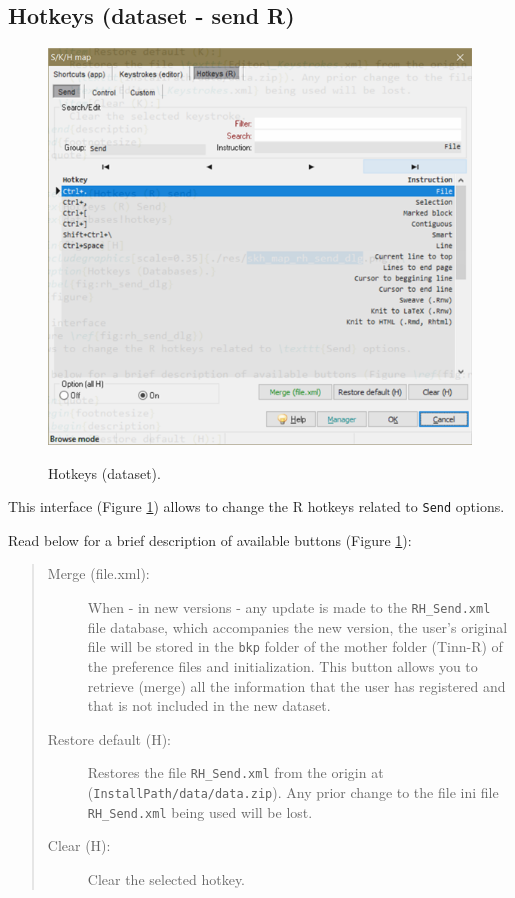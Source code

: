 \subsection{Hotkeys (dataset - send R)}

\begin{figure}[H]
  \includegraphics[scale=0.35]{./res/dlg_skh_map_rh_send.png}\\
  \caption{Hotkeys (dataset).}
  \label{fig:rh_send_dlg}
\end{figure}

This interface
(Figure \ref{fig:rh_send_dlg})
allows to change the R hotkeys related to \texttt{Send} options.

Read below for a brief description of available buttons (Figure \ref{fig:rh_send_dlg}):

\begin{quote}
  \begin{footnotesize}
    \begin{description}
      \item[Merge (file.xml):]
        When - in new versions - any update is made to the \texttt{RH\_Send.xml} file database,
        which accompanies the new version, the user's original file will be stored in
        the \texttt{bkp} folder of the mother folder (Tinn-R) of the preference files and initialization.
        This button allows you to retrieve (merge) all the information that the user has registered
        and that is not included in the new dataset.
      \item[Restore default (H):]
        Restores the file \texttt{RH\_Send.xml} from the origin at
        (\texttt{InstallPath/data/data.zip}). Any prior change to the file ini file
        \texttt{RH\_Send.xml} being used will be lost.
      \item[Clear (H):]
        Clear the selected hotkey.
    \end{description}
  \end{footnotesize}
\end{quote}


